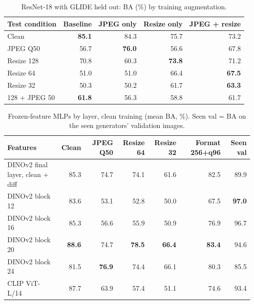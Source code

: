 \documentclass[10pt,a4paper]{article}
\newcommand{\best}[1]{\textbf{#1}}
\begin{document}
\begin{table}[H]
\centering\footnotesize
\caption{ResNet-18 with GLIDE held out: BA (\%) by training augmentation.}\label{tab:resnet}
\begin{tabular}{lrrrr}
\toprule
Test condition & Baseline & JPEG only & Resize only & JPEG + resize \\
\midrule
Clean & \best{85.1} & 84.3 & 75.7 & 73.2 \\
JPEG Q50 & 56.7 & \best{76.0} & 56.6 & 67.8 \\
Resize 128 & 70.8 & 60.3 & \best{73.8} & 71.2 \\
Resize 64 & 51.0 & 51.0 & 66.4 & \best{67.5} \\
Resize 32 & 50.3 & 50.2 & 61.7 & \best{63.3} \\
128 + JPEG 50 & \best{61.8} & 56.3 & 58.8 & 61.7 \\
\bottomrule
\end{tabular}
\end{table}

\begin{table}[H]
\centering\footnotesize
\caption{Frozen-feature MLPs by layer, clean training (mean BA, \%). Seen val = BA on the seen generators' validation images.}\label{tab:layers}
\begin{tabular}{lrrrrrr}
\toprule
Features & Clean & JPEG Q50 & Resize 64 & Resize 32 & Format 256+q96 & Seen val \\
\midrule
DINOv2 final layer, clean + diff & 85.3 & 74.7 & 74.1 & 61.6 & 82.5 & 89.9 \\
DINOv2 block 12 & 83.6 & 53.1 & 52.8 & 50.0 & 67.5 & \best{97.0} \\
DINOv2 block 16 & 85.3 & 56.6 & 55.9 & 50.9 & 76.9 & 96.7 \\
DINOv2 block 20 & \best{88.6} & 74.7 & \best{78.5} & \best{66.4} & \best{83.4} & 94.6 \\
DINOv2 block 24 & 81.5 & \best{76.9} & 74.4 & 66.1 & 80.3 & 85.5 \\
CLIP ViT-L/14 & 87.7 & 63.9 & 57.4 & 51.1 & 74.6 & 93.4 \\
\bottomrule
\end{tabular}
\end{table}
\end{document}
